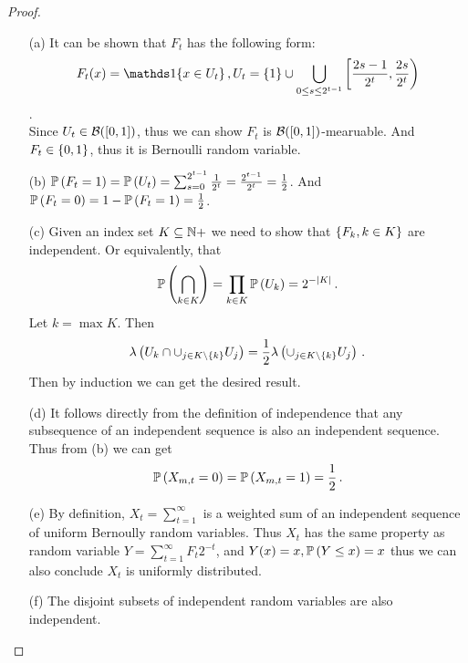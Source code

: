 \begin{proof}
    \begin{enumerate}
   \item[(a)] It can be shown that $F_t$ has the following form: 
   $$F_t(x) = \bOne{x\in U_t}, U_t = \set{1} \cup \bigcup_{0 \le s\le 2^{t-1}}\left[\frac{2s-1}{2^t}, \frac{2s}{2^t}\right)$$. \\
   Since $U_t \in \mathcal{B}([0,1])$, thus we can show $F_t$ is $\mathcal{B}([0,1])$-mearuable. And $F_t \in \left\{ 0,1 \right\}$, thus it is Bernoulli random variable. 
   \item[(b)] $\mathbb{P} \left(F_t = 1\right) = \mathbb{P} \left(U_t\right) = \sum_{s=0}^{2^{t-1}}\frac{1}{2^t} =\frac{2^{t-1}}{2^t} =\frac{1}{2}$. And $\mathbb{P} \left(F_t = 0\right) = 1-\mathbb{P} \left(F_t = 1\right)=\frac{1}{2}$.
   \item[(c)] Given an index set $K \subseteq \mathbb{N}+$ we need to show that $\left\{ F_k,k\in K \right\}$ are independent. Or equivalently, that
   \begin{align*}
      \mathbb{P} \left(\bigcap_{k \in K}\right) = \prod_{k \in K} \mathbb{P} \left(U_k\right) = 2^{-|K|}\,.
   \end{align*}
   Let $k=\max K$. Then 
   \begin{align*}
      \lambda \left(U_k \cap \cup_{j \in K \setminus \left\{ k \right\}} U_j \right) = \frac{1}{2} \lambda \left(\cup_{j \in K \setminus \left\{ k \right\}} U_j\right)\,.
   \end{align*}
   Then by induction we can get the desired result. 
   \item[(d)] It follows directly from the definition of independence that any subsequence of an independent sequence is also an independent sequence. Thus from (b) we can get
   \begin{align*}
      \mathbb{P} \left(X_{m,t} = 0 \right) = \mathbb{P} \left(X_{m,t} = 1 \right) =\frac{1}{2}\,.
   \end{align*}
   \item[(e)] 
By definition, $X_t = \sum_{t=1}^{\infty}$ is a weighted sum of an independent sequence of uniform Bernoully random variables. Thus $X_t$ has the same property as random variable $Y = \sum_{t=1}^\infty F_t 2^{-t}$, and $Y(x) = x, \mathbb{P} \left(Y \le x\right) = x$ thus we can also conclude $X_t$ is uniformly distributed. 

   \item[(f)] The disjoint subsets of independent random variables are also independent. 
\end{enumerate}
\end{proof}




    
